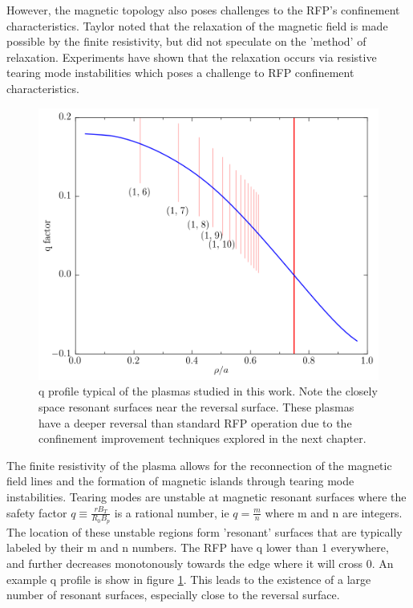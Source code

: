 \begin{refsection}
However, the magnetic topology also poses challenges to the RFP's confinement characteristics. Taylor noted that the relaxation of the magnetic field is made possible by the finite resistivity, but did not speculate on the 'method' of
relaxation. Experiments have shown that the relaxation occurs via resistive tearing mode instabilities which poses a challenge to RFP confinement characteristics.

\begin{figure}
	\centering
    \includegraphics[width = 1.\linewidth]{./1_Introduction/PPCD_q_profile.png}
    \caption[Example RPF q profile]{q profile typical of the plasmas studied in this work. Note the closely space resonant surfaces near the reversal surface. These plasmas have a deeper reversal than standard RFP operation due to the confinement improvement techniques explored in the next chapter.}
    \label{fig:q_profile}
\end{figure}

The finite resistivity of the plasma allows for the reconnection of the magnetic field lines and the formation of magnetic islands through tearing mode instabilities. Tearing modes are unstable at magnetic resonant surfaces where the safety factor $q \equiv \frac{rB_T}{R_0B_p}$ is a rational number, ie $q = \frac{m}{n}$ where m and n are integers. The location of these unstable regions form 'resonant' surfaces that are typically labeled by their m and n numbers. The RFP have q lower than 1 everywhere, and further decreases monotonously towards the edge where it will cross 0. An example q profile is show in figure \ref{fig:q_profile}. This leads to the existence of a large number of resonant surfaces, especially close to the reversal surface. 


\end{refsection}

